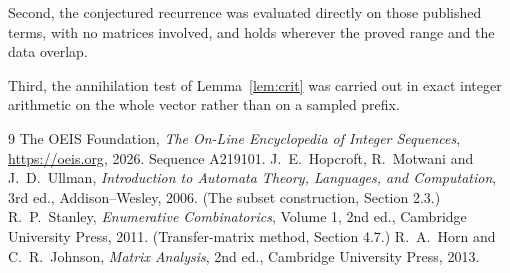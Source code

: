 \documentclass[11pt,a4paper]{article}
\theoremstyle{plain}
\theoremstyle{definition}
\begin{document}
Second, the conjectured recurrence was evaluated directly on those published terms, with no
matrices involved, and holds wherever the proved range and the data overlap.

Third, the annihilation test of Lemma~\ref{lem:crit} was carried out in exact integer
arithmetic on the whole vector rather than on a sampled prefix.

\begin{thebibliography}{9}
 The OEIS Foundation, \emph{The On-Line Encyclopedia of Integer
Sequences}, \url{https://oeis.org}, 2026. Sequence A219101.
 J.~E.~Hopcroft, R.~Motwani and J.~D.~Ullman, \emph{Introduction to Automata
Theory, Languages, and Computation}, 3rd ed., Addison--Wesley, 2006. (The subset
construction, Section 2.3.)
 R.~P.~Stanley, \emph{Enumerative Combinatorics}, Volume 1, 2nd ed.,
Cambridge University Press, 2011. (Transfer-matrix method, Section 4.7.)
 R.~A.~Horn and C.~R.~Johnson, \emph{Matrix Analysis}, 2nd ed., Cambridge
University Press, 2013.
\end{thebibliography}
\end{document}

